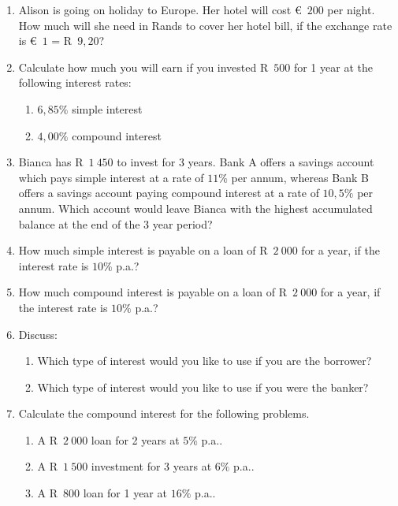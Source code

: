 \begin{eocexercises}{}
    \begin{enumerate}[label=\textbf{\arabic*}.]
	\item Alison is going on holiday to Europe. Her hotel will cost €~$200$ per night. How much will she need in Rands to cover her hotel bill, if the exchange rate is €~$1$ = R~$9,20$?

	\item Calculate how much you will earn if you invested R~$500$ for 1 year at the following interest rates:
	\begin{enumerate}[noitemsep, label=\textbf{(\alph*)} ]
	    \item $6,85\%$ simple interest
	    \item $4,00\%$ compound interest
	\end{enumerate}

	\item Bianca has R~$1~450$ to invest for 3 years. Bank A offers a savings account which pays simple interest at a rate of $11\%$ per annum, whereas Bank B offers a savings account paying compound interest at a rate of $10,5\%$ per annum. Which account would leave Bianca with the highest accumulated balance at the end of the 3 year period?

	\item How much simple interest is payable on a loan of R~$2~000$ for a year, if the interest rate is $10\%$ p.a.?

	\item How much compound interest is payable on a loan of R~$2~000$ for a year, if the interest rate is $10\%$ p.a.?

	\item Discuss:
	\begin{enumerate}[noitemsep, label=\textbf{(\alph*)} ]
	    \item Which type of interest would you like to use if you are the borrower?

	    \item Which type of interest would you like to use if you were the banker?
	\end{enumerate}

	\item Calculate the compound interest for the following problems.
	\begin{enumerate}[noitemsep, label=\textbf{(\alph*)} ]
	    \item A R~$2~000$ loan for 2 years at $5\%$ p.a..
	    \item A R~$1~500$ investment for 3 years at $6\%$ p.a..
	    \item A R~$800$ loan for 1 year at $16\%$ p.a..
	\end{enumerate}


\end{enumerate}
\end{eocexercises}
